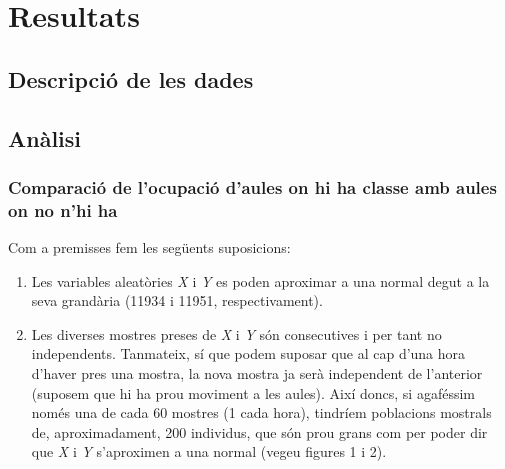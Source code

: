 \section{Resultats}
\captionsetup[figure]{labelsep=space}
\subsection{Descripció de les dades}


\subsection{Anàlisi}
\subsubsection{Comparació de l'ocupació d'aules on hi ha classe amb aules on no n'hi ha}


Com a premisses fem les següents suposicions:
\begin{enumerate}
	\item Les variables aleatòries \emph{X} i \emph{Y} es poden aproximar a una normal degut a la seva grandària (11934 i 11951, respectivament).
	\item Les diverses mostres preses de \emph{X} i \emph{Y} són consecutives i per tant no independents. Tanmateix, sí que podem suposar que al cap d'una hora d'haver pres una mostra, la nova mostra ja serà independent de l'anterior (suposem que hi ha prou moviment a les aules). Així doncs, si agaféssim només una de cada 60 mostres (1 cada hora), tindríem poblacions mostrals de, aproximadament, 200 individus, que són prou grans com per poder dir que \emph{X} i \emph{Y} s'aproximen a una normal (vegeu figures 1 i 2).
\end{enumerate}

